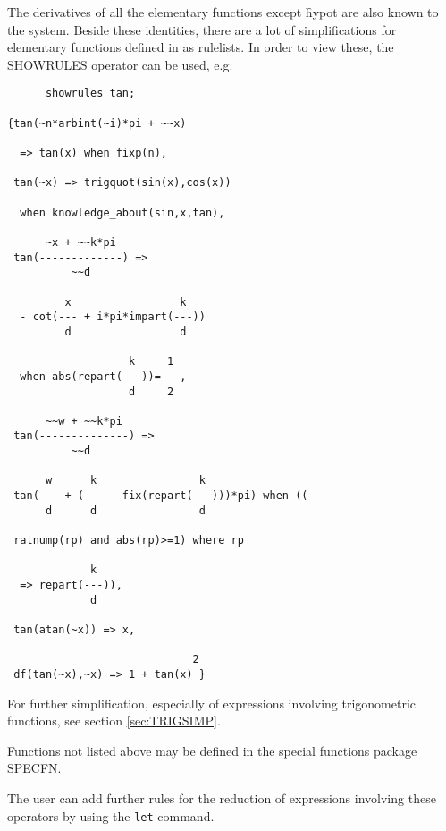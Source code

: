 The derivatives of all the elementary functions except \f{hypot} are
also known to the system.  Beside these identities, there are a lot of
simplifications for elementary functions defined in {\REDUCE} as
rulelists.  In order to view these, the SHOWRULES operator can be
used, e.g.
\begin{verbatim}
      showrules tan;

{tan(~n*arbint(~i)*pi + ~~x)

  => tan(x) when fixp(n),

 tan(~x) => trigquot(sin(x),cos(x))

  when knowledge_about(sin,x,tan),

      ~x + ~~k*pi
 tan(-------------) =>
          ~~d

         x                 k
  - cot(--- + i*pi*impart(---))
         d                 d

                   k     1
  when abs(repart(---))=---,
                   d     2

      ~~w + ~~k*pi
 tan(--------------) =>
          ~~d

      w      k                k
 tan(--- + (--- - fix(repart(---)))*pi) when ((
      d      d                d

 ratnump(rp) and abs(rp)>=1) where rp

             k
  => repart(---)),
             d

 tan(atan(~x)) => x,

                             2
 df(tan(~x),~x) => 1 + tan(x) }
\end{verbatim}
For further simplification, especially of expressions involving
trigonometric functions, see section \ref{sec:TRIGSIMP}.

Functions not listed above may be defined in the special functions
package SPECFN.

The user can add further rules for the reduction of expressions involving
these operators by using the \texttt{let} command.

